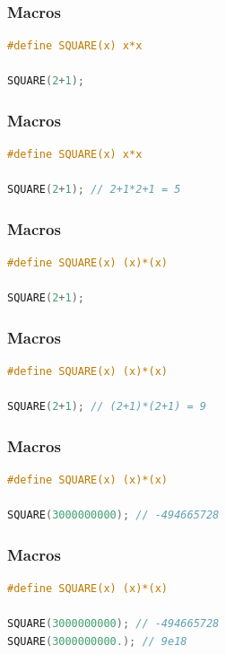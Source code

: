 \documentclass[12pt,compress]{beamer}
\begin{document}
\begin{frame}[fragile]
\frametitle{Macros}

\begin{lstlisting}[language=C,basicstyle=\ttfamily,keywordstyle=\color{red}]
#define SQUARE(x) x*x

SQUARE(2+1);
\end{lstlisting}

\end{frame}

\begin{frame}[fragile]
\frametitle{Macros}

\begin{lstlisting}[language=C,basicstyle=\ttfamily,keywordstyle=\color{red}]
#define SQUARE(x) x*x

SQUARE(2+1); // 2+1*2+1 = 5
\end{lstlisting}
\end{frame}


\begin{frame}[fragile]
\frametitle{Macros}

\begin{lstlisting}[language=C,basicstyle=\ttfamily,keywordstyle=\color{red}]
#define SQUARE(x) (x)*(x)

SQUARE(2+1);
\end{lstlisting}
\end{frame}


\begin{frame}[fragile]
\frametitle{Macros}

\begin{lstlisting}[language=C,basicstyle=\ttfamily,keywordstyle=\color{red}]
#define SQUARE(x) (x)*(x)

SQUARE(2+1); // (2+1)*(2+1) = 9
\end{lstlisting}
\end{frame}


\begin{frame}[fragile]
\frametitle{Macros}

\begin{lstlisting}[language=C,basicstyle=\ttfamily,keywordstyle=\color{red}]
#define SQUARE(x) (x)*(x)

SQUARE(3000000000); // -494665728
\end{lstlisting}
\end{frame}

\begin{frame}[fragile]
\frametitle{Macros}

\begin{lstlisting}[language=C,basicstyle=\ttfamily,keywordstyle=\color{red}]
#define SQUARE(x) (x)*(x)

SQUARE(3000000000); // -494665728
SQUARE(3000000000.); // 9e18
\end{lstlisting}
\end{frame}
\end{document}
